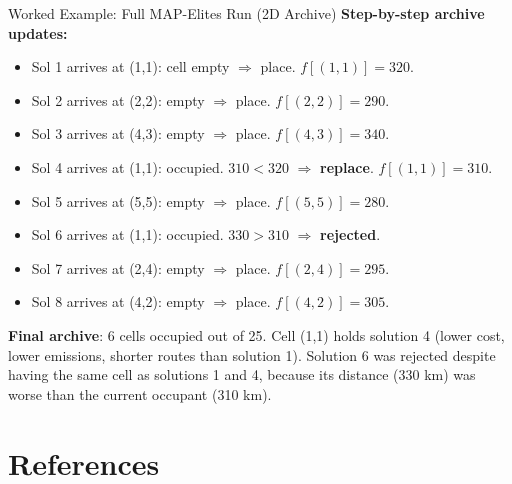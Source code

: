 \documentclass[aspectratio=169,10pt]{beamer}
\begin{document}
\begin{frame}[allowframebreaks]{Worked Example: Full MAP-Elites Run (2D Archive)}
\medskip
\textbf{Step-by-step archive updates:}
\begin{itemize}
  \item Sol 1 arrives at (1,1): cell empty $\Rightarrow$ place. $f[(1,1)]=320$.
  \item Sol 2 arrives at (2,2): empty $\Rightarrow$ place. $f[(2,2)]=290$.
  \item Sol 3 arrives at (4,3): empty $\Rightarrow$ place. $f[(4,3)]=340$.
  \item Sol 4 arrives at (1,1): occupied. $310 < 320$ $\Rightarrow$ \textbf{replace}. $f[(1,1)]=310$.
  \item Sol 5 arrives at (5,5): empty $\Rightarrow$ place. $f[(5,5)]=280$.
  \item Sol 6 arrives at (1,1): occupied. $330 > 310$ $\Rightarrow$ \textbf{rejected}.
  \item Sol 7 arrives at (2,4): empty $\Rightarrow$ place. $f[(2,4)]=295$.
  \item Sol 8 arrives at (4,2): empty $\Rightarrow$ place. $f[(4,2)]=305$.
\end{itemize}

\medskip
\textbf{Final archive}: 6 cells occupied out of 25.
Cell (1,1) holds solution 4 (lower cost, lower emissions, shorter
routes than solution 1).
Solution 6 was rejected despite having the same cell as solutions 1
and 4, because its distance (330 km) was worse than the current
occupant (310 km).

\end{frame}

\section{References}
\end{document}
